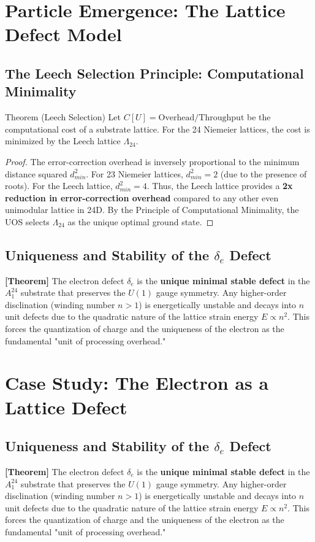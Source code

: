 \documentclass[11pt,titlepage]{article}
\newcommand{\leech}{\Lambda_{24}}
\newcommand{\tagtheo}{\textcolor{green!60!black}{\textbf{[Theorem]}} }
\begin{document}
\section{Particle Emergence: The Lattice Defect Model}

\subsection{The Leech Selection Principle: Computational Minimality}
\begin{mytheorem}{Theorem (Leech Selection)}
Let $C[U] = \text{Overhead} / \text{Throughput}$ be the computational cost of a substrate lattice. For the 24 Niemeier lattices, the cost is minimized by the Leech lattice $\leech$.
\end{mytheorem}
\begin{proof}
The error-correction overhead is inversely proportional to the minimum distance squared $d_{min}^2$. For 23 Niemeier lattices, $d_{min}^2 = 2$ (due to the presence of roots). For the Leech lattice, $d_{min}^2 = 4$. Thus, the Leech lattice provides a \textbf{2x reduction in error-correction overhead} compared to any other even unimodular lattice in 24D. By the Principle of Computational Minimality, the UOS selects $\leech$ as the unique optimal ground state.
\end{proof}

\subsection{Uniqueness and Stability of the \texorpdfstring{$\delta_e$}{delta\_e} Defect}
\tagtheo The electron defect $\delta_e$ is the \textbf{unique minimal stable defect} in the $A_1^{24}$ substrate that preserves the $U(1)$ gauge symmetry. Any higher-order disclination (winding number $n > 1$) is energetically unstable and decays into $n$ unit defects due to the quadratic nature of the lattice strain energy $E \propto n^2$. This forces the quantization of charge and the uniqueness of the electron as the fundamental "unit of processing overhead."
\section{Case Study: The Electron as a Lattice Defect}
\subsection{Uniqueness and Stability of the $\delta_e$ Defect}
\tagtheo The electron defect $\delta_e$ is the \textbf{unique minimal stable defect} in the $A_1^{24}$ substrate that preserves the $U(1)$ gauge symmetry. Any higher-order disclination (winding number $n > 1$) is energetically unstable and decays into $n$ unit defects due to the quadratic nature of the lattice strain energy $E \propto n^2$. This forces the quantization of charge and the uniqueness of the electron as the fundamental "unit of processing overhead."
\end{document}
